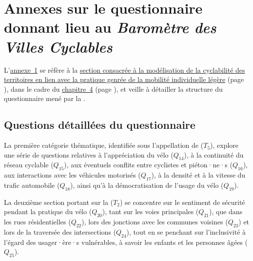     \setcounter{section}{0}
\chapter{Annexes sur le questionnaire donnant lieu au \textsl{Baromètre des Villes Cyclables}}
    \label{annexes:structure-questionnaire-fub}

L'\hyperref[annexes:structure-questionnaire-fub]{annexe~\ref{annexes:structure-questionnaire-fub}} se réfère à la \hyperref[section-chap4:cyclabilite-territoires-genre]{section consacrée à la modélisation de la cyclabilité des territoires en lien avec la pratique genrée de la mobilité individuelle légère} (page \pageref{section-chap4:cyclabilite-territoires-genre}), dans le cadre du \hyperref[chap4:titre]{chapitre~4} (page \pageref{chap4:titre}), et veille à détailler la structure du questionnaire mené par la \textcolor{blue}{\textcite{fub_barometre_2021}}.%

    \setcounter{tocdepth}{2}
    \renewcommand{\localcontentsname}{Structure de l'annexe~\ref{annexes:structure-questionnaire-fub}}
\localtableofcontents

    \newpage
\section{Questions détaillées du questionnaire}
    \label{annexes:structure-questionnaire-fub-questions}

La première catégorie thématique, identifiée sous l'appellation de  (\(T_{5}\)), explore une série de questions relatives à l'appréciation du vélo (\(Q_{14}\)), à la continuité du réseau cyclable (\(Q_{15}\)), aux éventuels conflits entre cyclistes et piéton·ne·s (\(Q_{16}\)), aux interactions avec les véhicules motorisés (\(Q_{17}\)), à la densité et à la vitesse du trafic automobile (\(Q_{18}\)), ainsi qu'à la démocratisation de l'usage du vélo (\(Q_{19}\)).

La deuxième section portant sur la  (\(T_{2}\)) se concentre sur le sentiment de sécurité pendant la pratique du vélo (\(Q_{20}\)), tant sur les voies principales (\(Q_{21}\)), que dans les rues résidentielles (\(Q_{22}\)), lors des jonctions avec les communes voisines (\(Q_{23}\)) et lors de la traversée des intersections (\(Q_{24}\)), tout en se penchant sur l'inclusivité à l'égard des usager·ère·s vulnérables, à savoir les enfants et les personnes âgées (\(Q_{25}\)).

